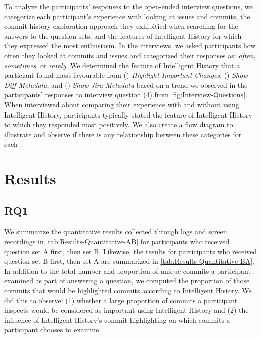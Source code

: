 To analyze the participants' responses to the open-ended interview questions, 
we categorize each participant's experience with looking at issues and commits,
the commit history exploration approach they exhibitied when searching for the answers to the question sets, 
and the features of Intelligent History for which they expressed the most enthusiasm.
In the interviews, we asked participants how often they looked at commits and issues 
and categorized their responses as: 
\textit{often}, \textit{sometimes}, or \textit{rarely}.
We determined the feature of Intelligent History that a particiant found most favourable from
() \textit{Highlight Important Changes}, 
() \textit{Show Diff Metadata}, and
() \textit{Show Jira Metadata}
based on a trend we observed in the participants' responses to interview question (4) from \autoref{fig:Interview-Questions}.
When interviewed about comparing their experience with and without using Intelligent History,
participants typically stated the feature of Intelligent History to which they responded most positively.
We also create a flow diagram to illustrate and observe if there is any 
relationship between these categories for each .

\section{Results}
\label{sec:Results}

\subsection{RQ1}
\label{subsec:RQ1}


We summarize the quantitative results collected through logs and screen recordings in \autoref{tab:Results-Quantitative-AB} 
for participants who received question set A first, then set B.
Likewise, the results for participants who received question set B first, then set A are summarized in \autoref{tab:Results-Quantitative-BA}.
In addition to the total number and proportion of unique commits a participant examined as part of answering a question,
we computed the proportion of those commits that would be highlighted commits according to Intelligent History.
We did this to observe:
(1) whether a large proportion of commits a participant inspects would be considered as important using Intelligent History
and (2) the influence of Intelligent History's commit highlighting on which commits a participant chooses to examine.

